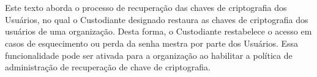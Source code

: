 \section*{}
\vspace*{\fill}
\large{Este texto aborda o processo de recuperação das chaves de criptografia dos Usuários, no qual o Custodiante designado restaura as chaves de criptografia dos usuários  de uma organização. Desta forma, o Custodiante restabelece o acesso em casos de esquecimento ou perda da senha mestra por parte dos Usuários. Essa funcionalidade pode ser ativada para a organização ao habilitar a política de administração de recuperação de chave de criptografia.}
\vspace*{\fill}

\pagebreak
